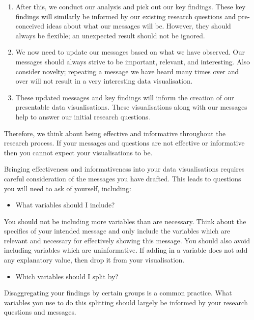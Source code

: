 \documentclass[
]{book}
\providecommand{\tightlist}{%
  \setlength{\itemsep}{0pt}\setlength{\parskip}{0pt}}
\begin{document}
\begin{enumerate}
\def\labelenumi{\arabic{enumi}.}
\setcounter{enumi}{2}
\item
  After this, we conduct our analysis and pick out our key findings. These key findings will similarly be informed by our existing research questions and pre-conceived ideas about what our messages will be. However, they should always be flexible; an unexpected result should not be ignored.
\item
  We now need to update our messages based on what we have observed. Our messages should always strive to be important, relevant, and interesting. Also consider novelty; repeating a message we have heard many times over and over will not result in a very interesting data visualisation.
\item
  These updated messages and key findings will inform the creation of our presentable data visualisations. These visualisations along with our messages help to answer our initial research questions.
\end{enumerate}

Therefore, we think about being effective and informative throughout the research process. If your messages and questions are not effective or informative then you cannot expect your visualisations to be.

Bringing effectiveness and informativeness into your data visualisations requires careful consideration of the messages you have drafted. This leads to questions you will need to ask of yourself, including:

\begin{itemize}
\tightlist
\item
  What variables should I include?
\end{itemize}

You should not be including more variables than are necessary. Think about the specifics of your intended message and only include the variables which are relevant and necessary for effectively showing this message. You should also avoid including variables which are uninformative. If adding in a variable does not add any explanatory value, then drop it from your visualisation.

\begin{itemize}
\tightlist
\item
  Which variables should I split by?
\end{itemize}

Disaggregating your findings by certain groups is a common practice. What variables you use to do this splitting should largely be informed by your research questions and messages.
\end{document}
